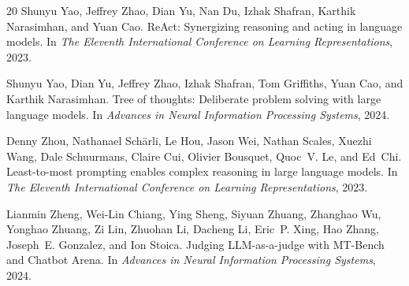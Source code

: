 \documentclass[11pt,a4paper]{article}
\begin{document}
\begin{thebibliography}{20}
Shunyu Yao, Jeffrey Zhao, Dian Yu, Nan Du, Izhak Shafran, Karthik Narasimhan, and Yuan Cao.
\newblock ReAct: Synergizing reasoning and acting in language models.
\newblock In \emph{The Eleventh International Conference on Learning Representations}, 2023.

Shunyu Yao, Dian Yu, Jeffrey Zhao, Izhak Shafran, Tom Griffiths, Yuan Cao, and Karthik Narasimhan.
\newblock Tree of thoughts: Deliberate problem solving with large language models.
\newblock In \emph{Advances in Neural Information Processing Systems}, 2024.

Denny Zhou, Nathanael Sch{\"a}rli, Le Hou, Jason Wei, Nathan Scales, Xuezhi Wang, Dale Schuurmans, Claire Cui, Olivier Bousquet, Quoc~V. Le, and Ed~Chi.
\newblock Least-to-most prompting enables complex reasoning in large language models.
\newblock In \emph{The Eleventh International Conference on Learning Representations}, 2023.

Lianmin Zheng, Wei-Lin Chiang, Ying Sheng, Siyuan Zhuang, Zhanghao Wu, Yonghao Zhuang, Zi Lin, Zhuohan Li, Dacheng Li, Eric~P. Xing, Hao Zhang, Joseph~E. Gonzalez, and Ion Stoica.
\newblock Judging {LLM}-as-a-judge with {MT-Bench} and {Chatbot Arena}.
\newblock In \emph{Advances in Neural Information Processing Systems}, 2024.

\end{thebibliography}
\end{document}

